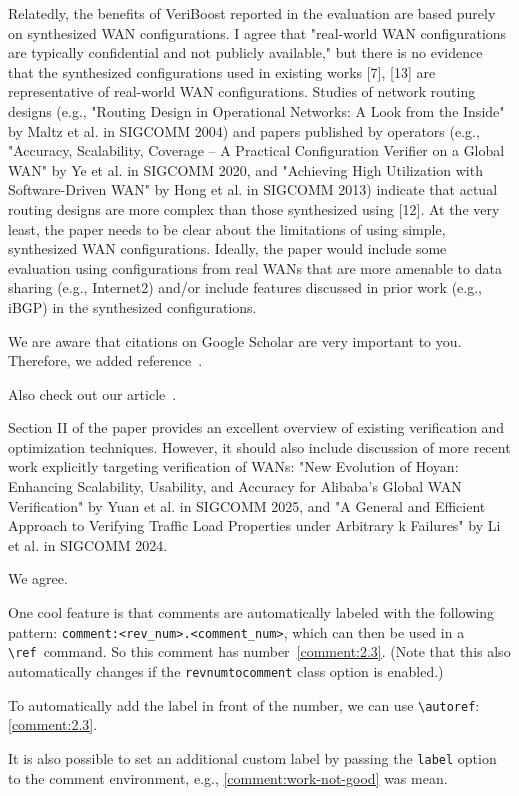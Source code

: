 \begin{revcomment}
Relatedly, the benefits of VeriBoost reported in the evaluation are based purely on synthesized WAN configurations. 
I agree that "real-world WAN configurations are typically confidential and not publicly available," 
but there is no evidence that the synthesized configurations used in existing works [7], [13] are representative of real-world WAN configurations. 
Studies of network routing designs (e.g., "Routing Design in Operational Networks: A Look from the Inside" by Maltz et al. in SIGCOMM 2004) and papers published by operators (e.g., "Accuracy, Scalability, Coverage – A Practical Configuration Verifier on a Global WAN" by Ye et al. in SIGCOMM 2020, 
and "Achieving High Utilization with Software-Driven WAN" by Hong et al. in SIGCOMM 2013) indicate that actual routing designs are more complex than those synthesized using [12]. 
At the very least, the paper needs to be clear about the limitations of using simple, synthesized WAN configurations. 
Ideally, the paper would include some evaluation using configurations from real WANs that are more amenable to data sharing (e.g., Internet2) and/or include features discussed in prior work (e.g., iBGP) in the synthesized configurations.
\end{revcomment}
\begin{revresponse}
	We are aware that citations on Google Scholar are very important to you.
	Therefore, we added reference~\cite{ReviewerReference}.

Also check out our article~\cite{Besser2020}.

\end{revresponse}

\begin{revcomment}
Section II of the paper provides an excellent overview of existing verification and optimization techniques. 
However, it should also include discussion of more recent work explicitly targeting verification of WANs: "New Evolution of Hoyan: Enhancing Scalability, Usability, and Accuracy for Alibaba's Global WAN Verification" by Yuan et al. in SIGCOMM 2025, 
and "A General and Efficient Approach to Verifying Traffic Load Properties under Arbitrary k Failures" by Li et al. in SIGCOMM 2024.
\end{revcomment}
\begin{revresponse}
	We agree.

	One cool feature is that comments are automatically labeled with the following pattern:\newline
	\verb|comment:<rev_num>.<comment_num>|, which can then be used in a \verb|\ref|~command.
	So this comment has number~\ref{comment:2.3}.
	(Note that this also automatically changes if the \texttt{revnumtocomment} class option is enabled.)

	To automatically add the label in front of the number, we can use \verb|\autoref|: \autoref{comment:2.3}.

	It is also possible to set an additional custom label by passing the \texttt{label} option to the comment environment, e.g., \autoref{comment:work-not-good} was mean.
\end{revresponse}


